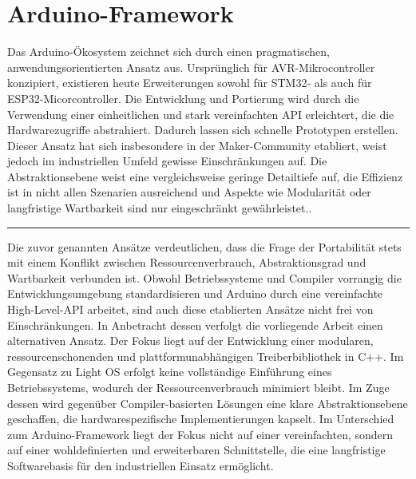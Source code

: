 \section{Arduino-Framework}
Das Arduino-Ökosystem zeichnet sich durch einen pragmatischen, anwendungsorientierten Ansatz aus.
Ursprünglich für AVR-Mikrocontroller konzipiert, existieren heute Erweiterungen sowohl für STM32- als auch für ESP32-Micorcontroller. 
Die Entwicklung und Portierung wird durch die Verwendung einer einheitlichen und stark vereinfachten API erleichtert, die die Hardwarezugriffe abstrahiert. 
Dadurch lassen sich schnelle Prototypen erstellen. 
Dieser Ansatz hat sich insbesondere in der Maker-Community etabliert, weist jedoch im industriellen Umfeld gewisse Einschränkungen auf. 
Die Abstraktionsebene weist eine vergleichsweise geringe Detailtiefe auf, die Effizienz ist in nicht allen Szenarien ausreichend und Aspekte wie Modularität oder langfristige Wartbarkeit sind nur eingeschränkt gewährleistet.\cite{stm32duino}\cite{arduinoesp32}. 

\vspace{0.5em}
\noindent\rule{\linewidth}{0.4pt}
\vspace{0.5em}

Die zuvor genannten Ansätze verdeutlichen, dass die Frage der Portabilität stets mit einem Konflikt zwischen Ressourcenverbrauch, Abstraktionsgrad und Wartbarkeit verbunden ist. 
Obwohl Betriebssysteme und Compiler vorrangig die Entwicklungsumgebung standardisieren und Arduino durch eine vereinfachte High-Level-API arbeitet, sind auch diese etablierten Ansätze nicht frei von Einschränkungen. 
In Anbetracht dessen verfolgt die vorliegende Arbeit einen alternativen Ansatz. 
Der Fokus liegt auf der Entwicklung einer modularen, ressourcenschonenden und plattformunabhängigen Treiberbibliothek in C++. 
Im Gegensatz zu Light OS erfolgt keine vollständige Einführung eines Betriebssystems, wodurch der Ressourcenverbrauch minimiert bleibt. 
Im Zuge dessen wird gegenüber Compiler-basierten Lösungen eine klare Abstraktionsebene geschaffen, die hardwarespezifische Implementierungen kapselt.
Im Unterschied zum Arduino-Framework liegt der Fokus nicht auf einer vereinfachten, sondern auf einer wohldefinierten und erweiterbaren Schnittstelle, die eine langfristige Softwarebasis für den industriellen Einsatz ermöglicht.